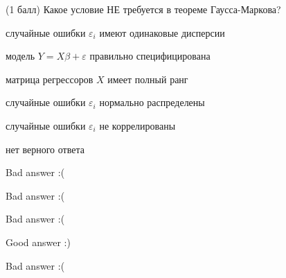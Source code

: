 
\begin{question}
(1 балл) Какое условие НЕ требуется в теореме Гаусса-Маркова?
\begin{answerlist}[2]
  \item случайные ошибки \(\varepsilon_i\) имеют одинаковые дисперсии
  \item модель \(Y=X\beta + \varepsilon\) правильно специфицирована
  \item матрица регрессоров \(X\) имеет полный ранг
  \item случайные ошибки \(\varepsilon_i\) нормально распределены
  \item случайные ошибки \(\varepsilon_i\) не коррелированы
  \item нет верного ответа
\end{answerlist}
\end{question}

\begin{solution}
\begin{answerlist}
  \item Bad answer :(
  \item Bad answer :(
  \item Bad answer :(
  \item Good answer :)
  \item Bad answer :(
\end{answerlist}
\end{solution}

